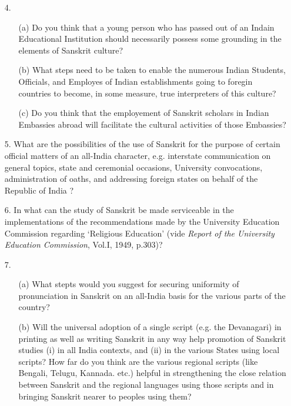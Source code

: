 {\rm 
\begin{itemize}
\item[4.] \begin{itemize}
             \item[(a)] Do you think that a young person who has passed out of an Indain Educational Institution should necessarily possess some grounding in the elements of Sanskrit culture? 
             
             \item[(b)] What steps need to be taken to enable the numerous Indian Students, Officials, and Employes of Indian establishments going to foregin countries to become, in some measure, true interpreters of this culture?
             
             \item[(c)] Do you think that the employement of Sanskrit scholars in Indian Embassies abroad will facilitate the cultural activities of those Embassies?
             \end{itemize}
             
\item[5.] What are the possibilities of the use of Sanskrit for the purpose of certain official matters of an all-India character, e.g. interstate communication on general topics, state and ceremonial occasions, University convocations, administration of oaths, and addressing foreign states on behalf of the Republic of India ?  
  
  \item[6.] In what can the study of Sanskrit be made serviceable in the implementations of the recommendations made by the University Education Commission regarding `Religious Education' (vide {\textit {Report of the University Education Commission}}, Vol.I, 1949, p.303)? 
  
  \item[7.] \begin{itemize}
            \item[(a)] What stepts would you suggest for securing uniformity of pronunciation in Sanskrit on an all-India basis for the various parts of the country?
            \item[(b)] Will the universal adoption of a single script (e.g. the Devanagari) in printing as well as writing Sanskrit in any way help promotion of Sanskrit studies (i) in all India contexts, and (ii) in the various States using local scripts? How far do you think are the various regional scripts (like Bengali, Telugu, Kannada. etc.) helpful in strengthening the close relation between Sanskrit and the regional languages using those scripts and in bringing  Sanskrit nearer to peoples using them?
            \end{itemize}
\end{itemize}
}

